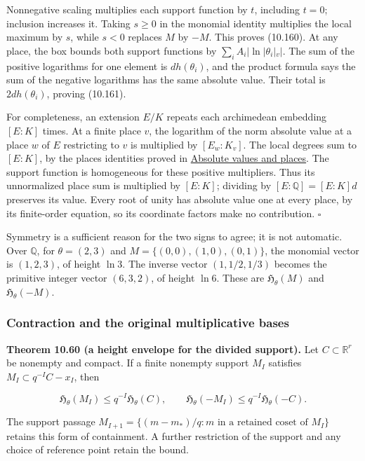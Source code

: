 \documentclass[
  11pt,
  a4paper,
]{article}
\newcounter{none} %
\begin{document}
Nonnegative scaling multiplies each support function by \(t\), including
\(t=0\); inclusion increases it. Taking \(s\ge0\) in the monomial
identity multiplies the local maximum by \(s\), while \(s<0\) replaces
\(M\) by \(-M\). This proves (10.160). At any place, the box bounds both
support functions by \(\sum_i A_i|\ln|\theta_i|_v|\). The sum of the
positive logarithms for one element is \(d h(\theta_i)\), and the
product formula says the sum of the negative logarithms has the same
absolute value. Their total is \(2d h(\theta_i)\), proving (10.161).

For completeness, an extension \(E/K\) repeats each archimedean
embedding \([E:K]\) times. At a finite place \(v\), the logarithm of the
norm absolute value at a place \(w\) of \(E\) restricting to \(v\) is
multiplied by \([E_w:K_v]\). The local degrees sum to \([E:K]\), by the
places identities proved in \href{../TR-BAKER-02.html}{Absolute values
and places}. The support function is homogeneous for these positive
multipliers. Thus its unnormalized place sum is multiplied by \([E:K]\);
dividing by \([E:\mathbb Q]=[E:K]d\) preserves its value. Every root of
unity has absolute value one at every place, by its finite-order
equation, so its coordinate factors make no contribution. \(\square\)

Symmetry is a sufficient reason for the two signs to agree; it is not
automatic. Over \(\mathbb Q\), for \(\theta=(2,3)\) and
\(M=\{(0,0),(1,0),(0,1)\}\), the monomial vector is \((1,2,3)\), of
height \(\ln3\). The inverse vector \((1,1/2,1/3)\) becomes the
primitive integer vector \((6,3,2)\), of height \(\ln6\). These are
\(\mathfrak H_\theta(M)\) and \(\mathfrak H_\theta(-M)\).

\subsubsection{Contraction and the original multiplicative
bases}\label{contraction-and-the-original-multiplicative-bases}

\textbf{Theorem 10.60 (a height envelope for the divided support).} Let
\(C\subset\mathbb R^r\) be nonempty and compact. If a finite nonempty
support \(M_I\) satisfies \(M_I\subset q^{-I}C-x_I\), then

\[
\mathfrak H_\theta(M_I)\le q^{-I}\mathfrak H_\theta(C),\qquad
\mathfrak H_\theta(-M_I)\le q^{-I}\mathfrak H_\theta(-C).
\tag{10.162}
\]

The support passage
\(M_{I+1}=\{(m-m_*)/q:m\text{ in a retained coset of }M_I\}\) retains
this form of containment. A further restriction of the support and any
choice of reference point retain the bound.
\end{document}

